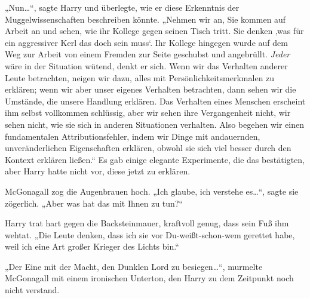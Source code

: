 „Nun…“, sagte Harry und überlegte, wie er diese Erkenntnis der Muggelwissenschaften beschreiben könnte. „Nehmen wir an, Sie kommen auf Arbeit an und sehen, wie ihr Kollege gegen seinen Tisch tritt. Sie denken ‚was für ein aggressiver Kerl das doch sein muss‘. Ihr Kollege hingegen wurde auf dem Weg zur Arbeit von einem Fremden zur Seite geschubst und angebrüllt. \emph{Jeder} wäre in der Situation wütend, denkt er sich. Wenn wir das Verhalten anderer Leute betrachten, neigen wir dazu, alles mit Persönlichkeitsmerkmalen zu erklären; wenn wir aber unser eigenes Verhalten betrachten, dann sehen wir die Umstände, die unsere Handlung erklären. Das Verhalten eines Menschen erscheint ihm selbst vollkommen schlüssig, aber wir sehen ihre Vergangenheit nicht, wir sehen nicht, wie sie sich in anderen Situationen verhalten. Also begehen wir einen fundamentalen Attributionsfehler, indem wir Dinge mit andauernden, unveränderlichen Eigenschaften erklären, obwohl sie sich viel besser durch den Kontext erklären ließen.“
Es gab einige elegante Experimente, die das bestätigten, aber Harry hatte nicht vor, diese jetzt zu erklären.

McGonagall zog die Augenbrauen hoch. „Ich glaube, ich verstehe es…“, sagte sie zögerlich. „Aber was hat das mit Ihnen zu tun?“

Harry trat hart gegen die Backsteinmauer, kraftvoll genug, dass sein Fuß ihm wehtat. „Die Leute denken, dass ich sie vor Du-weißt-schon-wem gerettet habe, weil ich eine Art großer Krieger des Lichts bin.“

„Der Eine mit der Macht, den Dunklen Lord zu besiegen…“, murmelte McGonagall mit einem ironischen Unterton, den Harry zu dem Zeitpunkt noch nicht verstand.

